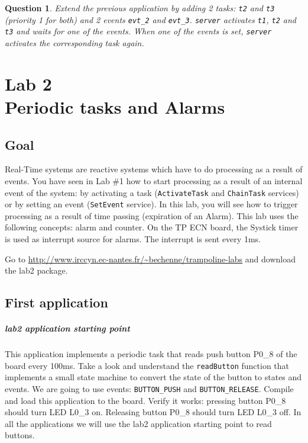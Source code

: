 \documentclass[11pt]{report}
\newtheorem{ex}{Question}
\begin{document}
\begin{ex}
Extend the previous application by adding 2 tasks: \texttt{t2} and \texttt{t3} (priority 1 for both) and 2 events \texttt{evt_2} and \texttt{evt_3}. \texttt{server} activates \texttt{t1}, \texttt{t2} and \texttt{t3} and waits for one of the events. When one of the events is set, \texttt{server} activates the corresponding task again.
\end{ex}

\chapter{Lab 2\\Periodic tasks and Alarms}

\section{Goal}

Real-Time systems are reactive systems which have to do processing as a result of events. You have seen in Lab \#1 how to start processing as a result of an internal event of the system: by activating a task (\texttt{ActivateTask} and \texttt{ChainTask} services) or by setting an event (\texttt{SetEvent} service). In this lab, you will see how to trigger processing as a result of time passing (expiration of an Alarm). This lab uses the following concepts: alarm and counter. On the TP ECN board, the Systick timer is used as interrupt source for alarms. The interrupt is sent every 1ms.

Go to \url{http://www.irccyn.ec-nantes.fr/~bechenne/trampoline-labs} and download the lab2 package.

\section{First application}

\paragraph{lab2 application starting point} This application implements a periodic task that reads push button P0_8 of the board every 100ms. Take a look and understand the {\tt readButton} function that implements a small state machine to convert the state of the button to states and events. We are going to use events: {\tt BUTTON_PUSH} and {\tt BUTTON_RELEASE}. Compile and load this application to the board. Verify it works: pressing button P0_8 should turn LED L0_3 on. Releasing button P0_8 should turn LED L0_3 off. In all the applications we will use the lab2 application starting point to read buttons.
\end{document}
